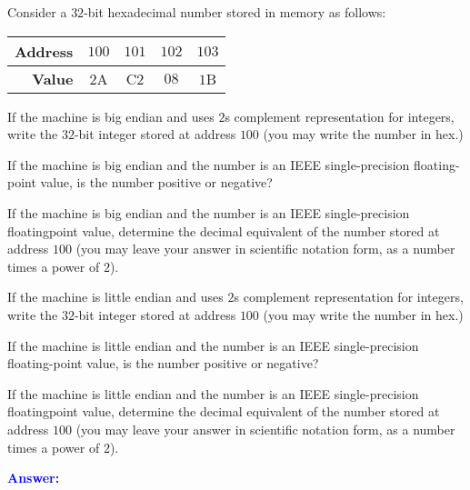 \item{}
Consider a $32$-bit hexadecimal number stored in memory as follows:\\
\begin{tabular}{|r|c|c|c|c|}
    \hline
    {\bf Address} & $100$ & $101$ & $102$ & $103$ \\ \hline
    {\bf Value} & $2$A & C$2$ & $08$ & $1$B \\ \hline
\end{tabular}
\begin{list}{\textbf{)}}{}
    \item If the machine is big endian and uses $2$s complement representation
        for integers, write the $32$-bit integer stored at address $100$ (you
        may write the number in hex.)
    \item If the machine is big endian and the number is an IEEE
        single-precision floating-point value, is the number positive or
        negative?
    \item If the machine is big endian and the number is an IEEE
        single-precision floating\-point value, determine the decimal equivalent
        of the number stored at address $100$ (you may leave your answer in
        scientific notation form, as a number times a power of $2$).
    \item If the machine is little endian and uses $2$s complement representation
        for integers, write the $32$-bit integer stored at address $100$ (you
        may write the number in hex.)
    \item If the machine is little endian and the number is an IEEE
        single-precision floating-point value, is the number positive or
        negative?
    \item If the machine is little endian and the number is an IEEE
        single-precision floating\-point value, determine the decimal equivalent
        of the number stored at address $100$ (you may leave your answer in
        scientific notation form, as a number times a power of $2$).
\end{list}
\vskip12pt
\ifanswers
\textcolor{blue}{
\textbf{Answer:}\\
}
\newpage
\fi
